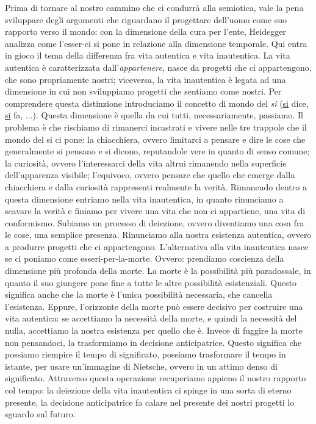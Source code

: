\documentclass[a4paper,12pt,oneside]{article}%
\begin{document}
Prima di tornare al nostro cammino che ci condurrà alla semiotica, vale la pena sviluppare degli argomenti che riguardano il progettare dell'uomo come suo rapporto verso il mondo: con la dimensione della cura per l'ente, Heidegger analizza come l’esser-ci si pone in relazione alla dimensione temporale.
Qui entra in gioco il tema della differenza fra vita autentica e vita inautentica.
La vita autentica è caratterizzata dall'\textit{appartenere}, nasce da progetti che ci appartengono, che sono propriamente nostri; viceversa, la vita inautentica è legata ad una dimensione in cui non sviluppiamo progetti che sentiamo come nostri.
Per comprendere questa distinzione introduciamo il concetto di mondo del \textit{si} (\underline{si} dice, \underline{si} fa, ...). Questa dimensione è quella da cui tutti, necessariamente, passiamo. Il problema è che rischiamo di rimanerci incastrati e vivere nelle tre trappole che il mondo del si ci pone: la chiacchiera, ovvero limitarci a pensare e dire le cose che generalmente si pensano e si dicono, reputandole vere in quanto di senso comune; la curiosità, ovvero l’interessarci della vita altrui rimanendo nella superficie dell’apparenza visibile; l’equivoco, ovvero pensare che quello che emerge dalla chiacchiera e dalla curiosità rappresenti realmente la verità.
Rimanendo dentro a questa dimensione entriamo nella vita inautentica, in quanto rinunciamo a scavare la verità e finiamo per vivere una vita che non ci appartiene, una vita di conformismo. Subiamo un processo di deiezione, ovvero diventiamo una cosa fra le cose, una semplice presenza. Rinunciamo alla nostra esistenza autentica, ovvero a produrre progetti che ci appartengono.
L’alternativa alla vita inautentica nasce se ci poniamo come esseri-per-la-morte. Ovvero: prendiamo coscienza della dimensione più profonda della morte. La morte è la possibilità più paradossale, in quanto il suo giungere pone fine a tutte le altre possibilità esistenziali. Questo significa anche che la morte è l’unica possibilità necessaria, che cancella l’esistenza. Eppure, l’orizzonte della morte può essere decisivo per costruire una vita autentica: se accettiamo la necessità della morte, e quindi la necessità del nulla, accettiamo la nostra esistenza per quello che è. Invece di fuggire la morte non pensandoci, la trasformiamo in decisione anticipatrice. Questo significa che possiamo riempire il tempo di significato, possiamo trasformare il tempo in istante, per usare un’immagine di Nietsche, ovvero in un attimo denso di significato. Attraverso questa operazione recuperiamo appieno il nostro rapporto col tempo: la deiezione della vita inautentica ci spinge in una sorta di eterno presente, la decisione anticipatrice fa calare nel presente dei nostri progetti lo sguardo sul futuro.
\end{document}
